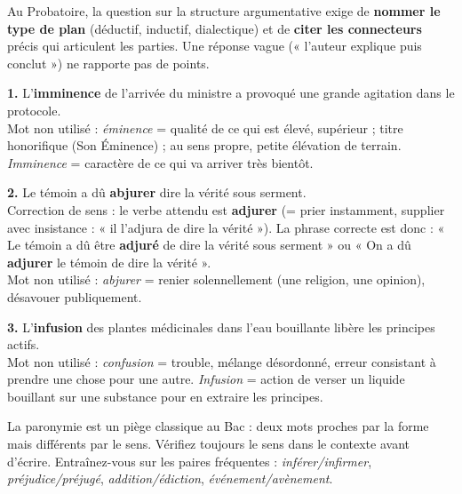 \documentclass[11pt]{article}
\begin{document}
\begin{attention}
Au Probatoire, la question sur la structure argumentative exige de \textbf{nommer le type de plan} (déductif, inductif, dialectique) et de \textbf{citer les connecteurs} précis qui articulent les parties. Une réponse vague (« l'auteur explique puis conclut ») ne rapporte pas de points.
\end{attention}

\begin{corrige}
\textbf{1.} L'\textbf{imminence} de l'arrivée du ministre a provoqué une grande agitation dans le protocole.\\
Mot non utilisé : \emph{éminence} = qualité de ce qui est élevé, supérieur ; titre honorifique (Son Éminence) ; au sens propre, petite élévation de terrain. \emph{Imminence} = caractère de ce qui va arriver très bientôt.

\textbf{2.} Le témoin a dû \textbf{abjurer} dire la vérité sous serment.\\
Correction de sens : le verbe attendu est \textbf{adjurer} (= prier instamment, supplier avec insistance : « il l'adjura de dire la vérité »). La phrase correcte est donc : « Le témoin a dû être \textbf{adjuré} de dire la vérité sous serment » ou « On a dû \textbf{adjurer} le témoin de dire la vérité ».\\
Mot non utilisé : \emph{abjurer} = renier solennellement (une religion, une opinion), désavouer publiquement.

\textbf{3.} L'\textbf{infusion} des plantes médicinales dans l'eau bouillante libère les principes actifs.\\
Mot non utilisé : \emph{confusion} = trouble, mélange désordonné, erreur consistant à prendre une chose pour une autre. \emph{Infusion} = action de verser un liquide bouillant sur une substance pour en extraire les principes.
\end{corrige}

\begin{attention}
La paronymie est un piège classique au Bac : deux mots proches par la forme mais différents par le sens. Vérifiez toujours le sens dans le contexte avant d'écrire. Entraînez-vous sur les paires fréquentes : \emph{inférer/infirmer}, \emph{préjudice/préjugé}, \emph{addition/édiction}, \emph{événement/avènement}.
\end{attention}
\end{document}
